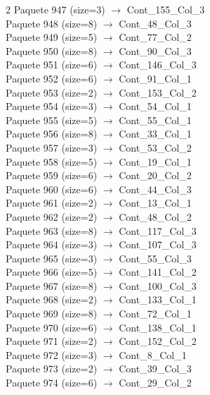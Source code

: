 \begin{multicols}{2}
Paquete 947 (size=3) $\rightarrow$ Cont\_155\_Col\_3\\
Paquete 948 (size=8) $\rightarrow$ Cont\_48\_Col\_3\\
Paquete 949 (size=5) $\rightarrow$ Cont\_77\_Col\_2\\
Paquete 950 (size=8) $\rightarrow$ Cont\_90\_Col\_3\\
Paquete 951 (size=6) $\rightarrow$ Cont\_146\_Col\_3\\
Paquete 952 (size=6) $\rightarrow$ Cont\_91\_Col\_1\\
Paquete 953 (size=2) $\rightarrow$ Cont\_153\_Col\_2\\
Paquete 954 (size=3) $\rightarrow$ Cont\_54\_Col\_1\\
Paquete 955 (size=5) $\rightarrow$ Cont\_55\_Col\_1\\
Paquete 956 (size=8) $\rightarrow$ Cont\_33\_Col\_1\\
Paquete 957 (size=3) $\rightarrow$ Cont\_53\_Col\_2\\
Paquete 958 (size=5) $\rightarrow$ Cont\_19\_Col\_1\\
Paquete 959 (size=6) $\rightarrow$ Cont\_20\_Col\_2\\
Paquete 960 (size=6) $\rightarrow$ Cont\_44\_Col\_3\\
Paquete 961 (size=2) $\rightarrow$ Cont\_13\_Col\_1\\
Paquete 962 (size=2) $\rightarrow$ Cont\_48\_Col\_2\\
Paquete 963 (size=8) $\rightarrow$ Cont\_117\_Col\_3\\
Paquete 964 (size=3) $\rightarrow$ Cont\_107\_Col\_3\\
Paquete 965 (size=3) $\rightarrow$ Cont\_55\_Col\_3\\
Paquete 966 (size=5) $\rightarrow$ Cont\_141\_Col\_2\\
Paquete 967 (size=8) $\rightarrow$ Cont\_100\_Col\_3\\
Paquete 968 (size=2) $\rightarrow$ Cont\_133\_Col\_1\\
Paquete 969 (size=8) $\rightarrow$ Cont\_72\_Col\_1\\
Paquete 970 (size=6) $\rightarrow$ Cont\_138\_Col\_1\\
Paquete 971 (size=2) $\rightarrow$ Cont\_152\_Col\_2\\
Paquete 972 (size=3) $\rightarrow$ Cont\_8\_Col\_1\\
Paquete 973 (size=2) $\rightarrow$ Cont\_39\_Col\_3\\
Paquete 974 (size=6) $\rightarrow$ Cont\_29\_Col\_2\\

\end{multicols}
